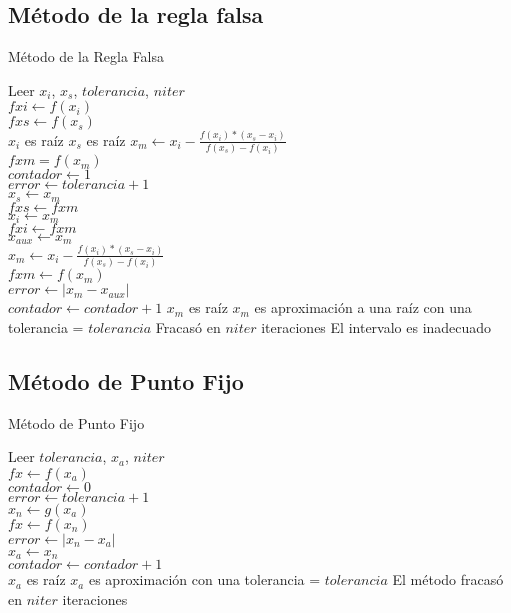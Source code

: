 \documentclass[12pt]{article}
\begin{document}
\subsection{Método de la regla falsa}
\begin{algorithm}[H]
	\caption{Método de la Regla Falsa}
	\SetAlgoLined
	Leer $x_i$, $x_s$, $tolerancia$, $niter$ \\
	$fxi \leftarrow f(x_i)$ \\
	$fxs \leftarrow f(x_s)$ \\
	{$x_i$ es raíz}
	{$x_s$ es raíz}
	{
		$x_m \leftarrow x_i - \frac{f(x_i)*(x_s - x_i)}{f(x_s) - f(x_i)}$\\
		$fxm = f(x_m)$\\
		$contador \leftarrow 1$\\
		$error \leftarrow tolerancia + 1$ \\
		{
			{$x_s \leftarrow x_m$\\
				$fxs \leftarrow fxm$\\}
			{$x_i \leftarrow x_m$\\
				$fxi \leftarrow fxm$\\}
			$x_{aux} \leftarrow x_m$\\
			$x_m \leftarrow x_i - \frac{f(x_i)*(x_s - x_i)}{f(x_s) - f(x_i)}$\\
			$fxm \leftarrow f(x_m)$\\
			$error \leftarrow |x_m - x_{aux}|$\\
			$contador \leftarrow contador + 1$
		}
		{$x_m$ es raíz}
		{$x_m$ es aproximación a una raíz con una tolerancia = $tolerancia$}
		\Else
		{Fracasó en $niter$ iteraciones}
	}
	\Else
	{El intervalo es inadecuado}
\end{algorithm}
\subsection{Método de Punto Fijo}
\begin{algorithm}[H]
	\caption{Método de Punto Fijo}
	\SetAlgoLined
	Leer $tolerancia$, $x_a$, $niter$\\
	$fx \leftarrow f(x_a)$\\
	$contador \leftarrow 0$ \\
	$error \leftarrow tolerancia + 1$\\
	{
		$x_n \leftarrow g(x_a)$\\
		$fx \leftarrow f(x_n)$\\
		$error \leftarrow |x_n - x_a|$\\
		$x_a \leftarrow x_n$\\
		$contador \leftarrow contador + 1$\\
	}
	{$x_a$ es raíz}
	{$x_a$ es aproximación con una tolerancia = $tolerancia$}
	\Else
	{El método fracasó en $niter$ iteraciones}
\end{algorithm}
\end{document}
